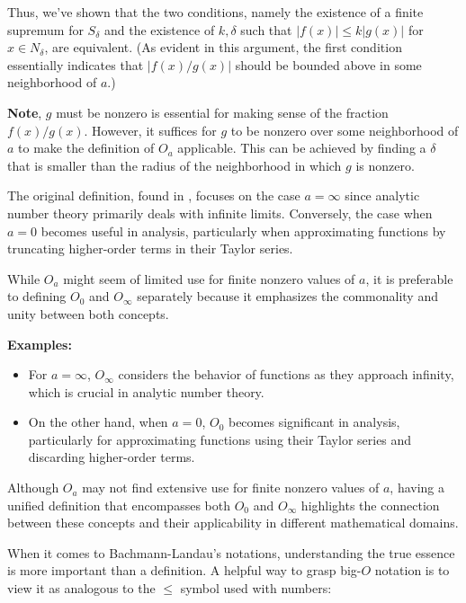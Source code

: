 \documentclass[9pt]{report}
\theoremstyle{definition}
\begin{document}
Thus, we've shown that the two conditions, namely the existence of a finite supremum for \(S_{\delta}\) and the existence of \(k, \delta\) such that \(\left| f(x) \right| \leq k \left| g(x) \right|\) for \(x \in N_{\delta}\), are equivalent. (As evident in this argument, the first condition essentially indicates that \(\left| f(x)/g(x) \right|\) should be bounded above in some neighborhood of \(a\).)




\textbf{Note},  \(g\) must be nonzero is essential for making sense of the fraction \(f(x)/g(x)\). However, it suffices for \(g\) to be nonzero over some neighborhood of \(a\) to make the definition of \(O_a\) applicable. This can be achieved by finding a \(\delta\) that is smaller than the radius of the neighborhood in which \(g\) is nonzero.

The original definition, found in \cite{Landau1909}, focuses on the case \(a=\infty\) since analytic number theory primarily deals with infinite limits. Conversely, the case when \(a = 0\) becomes useful in analysis, particularly when approximating functions by truncating higher-order terms in their Taylor series.

While \(O_a\) might seem of limited use for finite nonzero values of \(a\), it is preferable to defining \(O_0\) and \(O_{\infty}\) separately because it emphasizes the commonality and unity between both concepts.

\textbf{Examples:}
\begin{itemize}
 
\item  For \(a=\infty\), \(O_{\infty}\) considers the behavior of functions as they approach infinity, which is crucial in analytic number theory.

\item On the other hand, when \(a = 0\), \(O_0\) becomes significant in analysis, particularly for approximating functions using their Taylor series and discarding higher-order terms.
\end{itemize}

Although \(O_a\) may not find extensive use for finite nonzero values of \(a\), having a unified definition that encompasses both \(O_0\) and \(O_{\infty}\) highlights the connection between these concepts and their applicability in different mathematical domains.


When it comes to Bachmann-Landau's notations, understanding the true essence is more important than a definition. A helpful way to grasp big-$O$ notation is to view it as analogous to the \(\le\) symbol used with numbers:
\end{document}
